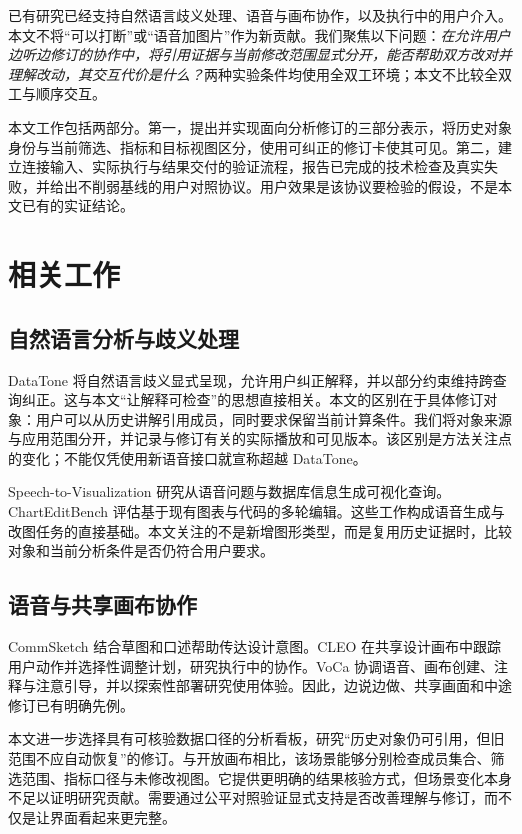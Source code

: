 \documentclass[conference]{IEEEtran}
\begin{document}
已有研究已经支持自然语言歧义处理、语音与画布协作，以及执行中的用户介入\cite{datatone,cleo,voca}。本文不将“可以打断”或“语音加图片”作为新贡献。我们聚焦以下问题：\emph{在允许用户边听边修订的协作中，将引用证据与当前修改范围显式分开，能否帮助双方改对并理解改动，其交互代价是什么？}两种实验条件均使用全双工环境；本文不比较全双工与顺序交互。

本文工作包括两部分。第一，提出并实现面向分析修订的三部分表示，将历史对象身份与当前筛选、指标和目标视图区分，使用可纠正的修订卡使其可见。第二，建立连接输入、实际执行与结果交付的验证流程，报告已完成的技术检查及真实失败，并给出不削弱基线的用户对照协议。用户效果是该协议要检验的假设，不是本文已有的实证结论。

\section{相关工作}
\subsection{自然语言分析与歧义处理}
DataTone 将自然语言歧义显式呈现，允许用户纠正解释，并以部分约束维持跨查询纠正\cite{datatone}。这与本文“让解释可检查”的思想直接相关。本文的区别在于具体修订对象：用户可以从历史讲解引用成员，同时要求保留当前计算条件。我们将对象来源与应用范围分开，并记录与修订有关的实际播放和可见版本。该区别是方法关注点的变化；不能仅凭使用新语音接口就宣称超越 DataTone。

Speech-to-Visualization 研究从语音问题与数据库信息生成可视化查询\cite{speechvis}。ChartEditBench 评估基于现有图表与代码的多轮编辑\cite{charteditbench}。这些工作构成语音生成与改图任务的直接基础。本文关注的不是新增图形类型，而是复用历史证据时，比较对象和当前分析条件是否仍符合用户要求。

\subsection{语音与共享画布协作}
CommSketch 结合草图和口述帮助传达设计意图\cite{commsketch}。CLEO 在共享设计画布中跟踪用户动作并选择性调整计划，研究执行中的协作\cite{cleo}。VoCa 协调语音、画布创建、注释与注意引导，并以探索性部署研究使用体验\cite{voca}。因此，边说边做、共享画面和中途修订已有明确先例。

本文进一步选择具有可核验数据口径的分析看板，研究“历史对象仍可引用，但旧范围不应自动恢复”的修订。与开放画布相比，该场景能够分别检查成员集合、筛选范围、指标口径与未修改视图。它提供更明确的结果核验方式，但场景变化本身不足以证明研究贡献。需要通过公平对照验证显式支持是否改善理解与修订，而不仅是让界面看起来更完整。
\end{document}

